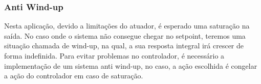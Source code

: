 \subsubsection{Anti Wind-up}

Nesta aplicação, devido a limitações do atuador, é esperado uma saturação na saída. No caso onde o sistema não consegue chegar no setpoint, teremos uma situação chamada de wind-up, na qual, a sua resposta integral irá crescer de forma indefinida. Para evitar problemas no controlador, é necessário a implementação de um sistema anti wind-up, no caso, a ação escolhida é congelar a ação do controlador em caso de saturação.  

